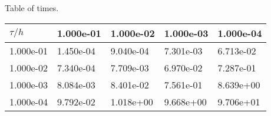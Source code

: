 \begin{center}
Table of times.
  
\begin{tabular}{|p{1in}|p{1in}|p{1in}|p{1in}|p{1in}|} \hline
$\tau / h$ &1.000e-01 &1.000e-02 &1.000e-03 &1.000e-04 \\ \hline 
1.000e-01 &1.450e-04 &9.040e-04 &7.301e-03 &6.713e-02 \\ \hline 
1.000e-02 &7.340e-04 &7.709e-03 &6.970e-02 &7.287e-01 \\ \hline 
1.000e-03 &8.084e-03 &8.401e-02 &7.561e-01 &8.639e+00 \\ \hline 
1.000e-04 &9.792e-02 &1.018e+00 &9.668e+00 &9.706e+01 \\ \hline 

\end{tabular}\\[20pt]
\end{center}
